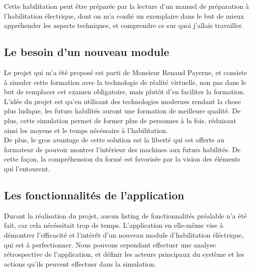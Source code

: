 \documentclass[a4paper]{article}
\begin{document}
        Cette habilitation peut être préparée par la lecture d'un manuel de préparation à l'habilitation électrique, dont on m'a confié un exemplaire dans le but de mieux appréhender les aspects techniques, et comprendre ce sur quoi j'allais travailler.

        \vfill
    \subsection{Le besoin d'un nouveau module}

        Le projet qui m'a été proposé est parti de Monsieur Renaud Payerne, et consiste à simuler cette formation avec la technologie de réalité virtuelle, non pas dans le but de remplacer cet examen obligatoire, mais plutôt d'en faciliter la formation. \\

        L'idée du projet est qu'en utilisant des technologies modernes rendant la chose plus ludique, les futurs habilités auront une formation de meilleure qualité. De plus, cette simulation permet de former plus de personnes à la fois, réduisant ainsi les moyens et le temps nécéssaire à l'habilitation. \\   

        De plus, le gros avantage de cette solution est la liberté qui est offerte au formateur de pouvoir montrer l'intérieur des machines aux futurs habilités. De cette façon, la compréhension du formé est favorisée par la vision des éléments qui l'entourent. \\

        \vfill
        \newpage

    \subsection{Les fonctionnalités de l'application}

    Durant la réalisation du projet, aucun listing de fonctionnalités préalable n'a été fait, car cela nécéssitait trop de temps. L'application en elle-même vise à démontrer l'efficacité et l'intérêt d'un nouveau module d'habilitation éléctrique, qui est à perfectionner. Nous pouvons cependant effectuer une analyse rétrospective de l'application, et définir les acteurs principaux du système et les actions qu'ils peuvent effectuer dans la simulation. \\
\end{document}
